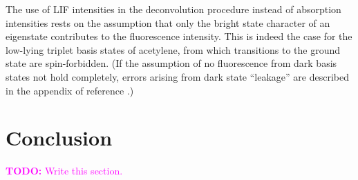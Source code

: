 \documentclass[12pt]{mitthesis}
\newcommand{\TODO} [1]{\textcolor{magenta}{\textbf{TODO:} #1}}
\begin{document}
The use of LIF intensities in the deconvolution procedure instead of
absorption intensities rests on the assumption that only the bright
state character of an eigenstate contributes to the fluorescence
intensity.  This is indeed the case for the low-lying triplet basis
states of acetylene, from which transitions to the ground state are
spin-forbidden.  (If the assumption of no fluorescence from dark basis
states not hold completely, errors arising from dark state ``leakage''
are described in the appendix of reference \cite{delon95}.)

\section{Conclusion}

\TODO{Write this section.}



\end{document}
